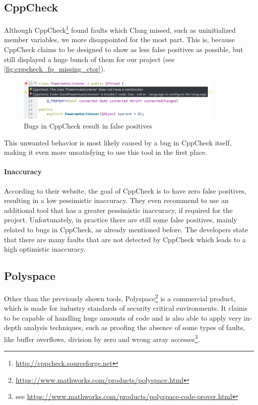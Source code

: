 \documentclass{scrreprt}
\begin{document}
\subsection{CppCheck} 

Although CppCheck\footnote{\url{http://cppcheck.sourceforge.net}} found faults which Clang missed, such as uninitialized member variables, we more disappointed for the most part. This is, because CppCheck claims to be designed to show as less false positives as possible, but still displayed a huge bunch of them for our project (see \vref{fig:cppcheck_fp_missing_ctor}).

\begin{figure}[h]
	\centering
	\includegraphics[width=0.9\textwidth]{img/cppcheck_fp_missing_ctor}
	\caption[Bugs in CppCheck]{Bugs in CppCheck result in false positives}
	\label{fig:cppcheck_fp_missing_ctor}
\end{figure}

This unwanted behavior is most likely caused by a bug in CppCheck itself, making it even more unsatisfying to use this tool in the first place.

\paragraph{Inaccuracy}

According to their website, the goal of CppCheck is to have zero false positives, resulting in a low pessimistic inaccuracy. They even recommend to use an additional tool that has a greater pessimistic inaccuracy, if required for the project. Unfortunately, in practice there are still some false positives, mainly related to bugs in CppCheck, as already mentioned before. The developers state that there are many faults that are not detected by CppCheck which leads to a high optimistic inaccuracy.

\subsection{Polyspace} 

Other than the previously shown tools, Polyspace\footnote{\url{https://www.mathworks.com/products/polyspace.html}} is a commercial product, which is made for industry standards of security critical environments. It claims to be capable of handling huge amounts of code and is also able to apply very in-depth analysis techniques, such as proofing the absence of some types of faults, like buffer overflows, division by zero and wrong array accesses\footnote{see \url{https://www.mathworks.com/products/polyspace-code-prover.html}}.
\end{document}
